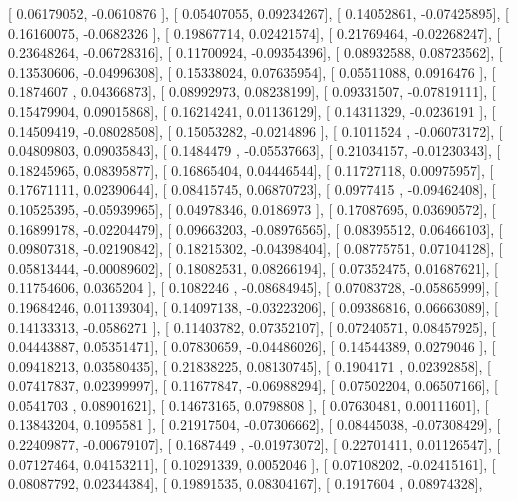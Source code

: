 \documentclass{article}
\begin{document}
       [ 0.06179052, -0.0610876 ],
       [ 0.05407055,  0.09234267],
       [ 0.14052861, -0.07425895],
       [ 0.16160075, -0.0682326 ],
       [ 0.19867714,  0.02421574],
       [ 0.21769464, -0.02268247],
       [ 0.23648264, -0.06728316],
       [ 0.11700924, -0.09354396],
       [ 0.08932588,  0.08723562],
       [ 0.13530606, -0.04996308],
       [ 0.15338024,  0.07635954],
       [ 0.05511088,  0.0916476 ],
       [ 0.1874607 ,  0.04366873],
       [ 0.08992973,  0.08238199],
       [ 0.09331507, -0.07819111],
       [ 0.15479904,  0.09015868],
       [ 0.16214241,  0.01136129],
       [ 0.14311329, -0.0236191 ],
       [ 0.14509419, -0.08028508],
       [ 0.15053282, -0.0214896 ],
       [ 0.1011524 , -0.06073172],
       [ 0.04809803,  0.09035843],
       [ 0.1484479 , -0.05537663],
       [ 0.21034157, -0.01230343],
       [ 0.18245965,  0.08395877],
       [ 0.16865404,  0.04446544],
       [ 0.11727118,  0.00975957],
       [ 0.17671111,  0.02390644],
       [ 0.08415745,  0.06870723],
       [ 0.0977415 , -0.09462408],
       [ 0.10525395, -0.05939965],
       [ 0.04978346,  0.0186973 ],
       [ 0.17087695,  0.03690572],
       [ 0.16899178, -0.02204479],
       [ 0.09663203, -0.08976565],
       [ 0.08395512,  0.06466103],
       [ 0.09807318, -0.02190842],
       [ 0.18215302, -0.04398404],
       [ 0.08775751,  0.07104128],
       [ 0.05813444, -0.00089602],
       [ 0.18082531,  0.08266194],
       [ 0.07352475,  0.01687621],
       [ 0.11754606,  0.0365204 ],
       [ 0.1082246 , -0.08684945],
       [ 0.07083728, -0.05865999],
       [ 0.19684246,  0.01139304],
       [ 0.14097138, -0.03223206],
       [ 0.09386816,  0.06663089],
       [ 0.14133313, -0.0586271 ],
       [ 0.11403782,  0.07352107],
       [ 0.07240571,  0.08457925],
       [ 0.04443887,  0.05351471],
       [ 0.07830659, -0.04486026],
       [ 0.14544389,  0.0279046 ],
       [ 0.09418213,  0.03580435],
       [ 0.21838225,  0.08130745],
       [ 0.1904171 ,  0.02392858],
       [ 0.07417837,  0.02399997],
       [ 0.11677847, -0.06988294],
       [ 0.07502204,  0.06507166],
       [ 0.0541703 ,  0.08901621],
       [ 0.14673165,  0.0798808 ],
       [ 0.07630481,  0.00111601],
       [ 0.13843204,  0.1095581 ],
       [ 0.21917504, -0.07306662],
       [ 0.08445038, -0.07308429],
       [ 0.22409877, -0.00679107],
       [ 0.1687449 , -0.01973072],
       [ 0.22701411,  0.01126547],
       [ 0.07127464,  0.04153211],
       [ 0.10291339,  0.0052046 ],
       [ 0.07108202, -0.02415161],
       [ 0.08087792,  0.02344384],
       [ 0.19891535,  0.08304167],
       [ 0.1917604 ,  0.08974328],
\end{document}

